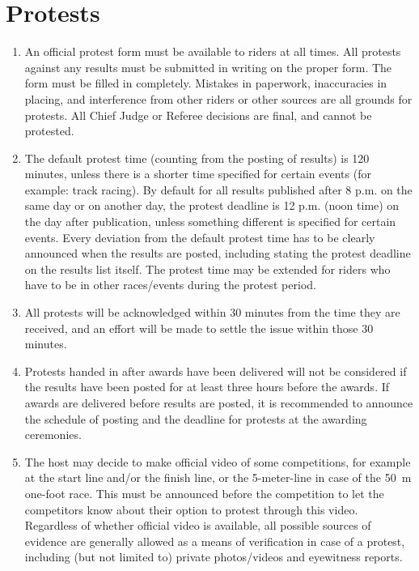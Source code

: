 \section{Protests}

\begin{enumerate}[leftmargin=1.5em,labelsep=*]
	\item An official protest form must be available to riders at all times.
	All protests against any results must be submitted in writing on the proper form.
	The form must be filled in completely.
	Mistakes in paperwork, inaccuracies in placing, and interference from other riders or other sources are all grounds for protests.
	All Chief Judge or Referee decisions are final, and cannot be protested.
	\item The default protest time (counting from the posting of results) is 120 minutes, unless there is a shorter time specified for certain events (for example: track racing).
	By default for all results published after 8 p.m. on the same day or on another day, the protest deadline is 12 p.m. (noon time) on the day after publication, unless something different is specified for certain events.
	Every deviation from the default protest time has to be clearly announced when the results are posted, including stating the protest deadline on the results list itself.
	The protest time may be extended for riders who have to be in other races/events during the protest period.
	\item  All protests will be acknowledged within 30 minutes from the time they are received, and an effort will be made to settle the issue within those 30 minutes.
	\item Protests handed in after awards have been delivered will not be considered if the results have been posted for at least three hours before the awards.
	If awards are delivered before results are posted, it is recommended to announce the schedule of posting and the deadline for protests at the awarding ceremonies.
	\item The host may decide to make official video of some competitions, for example at the start line and/or the finish line, or the 5-meter-line in case of the 50~m one-foot race.
	This must be announced before the competition to let the competitors know about their option to protest through this video.
	Regardless of whether official video is available, all possible sources of evidence are generally allowed as a means of verification in case of a protest, including (but not limited to) private photos/videos and eyewitness reports.

\end{enumerate}
